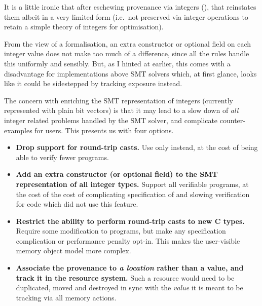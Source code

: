 It is a little ironic that after eschewing provenance via integers (),
that  reinstates them albeit in a very limited form (i.e.\ not preserved
via integer operations to retain a simple theory of integers for optimisation).

From the view of a formalisation, an extra constructor or optional field on
each integer value does not make too much of a difference, since all the rules
handle this uniformly and sensibly. But, as I hinted at earlier, this comes
with a disadvantage for implementations above SMT solvers which, at first
glance, looks like it could be sidestepped by tracking exposure instead.

The concern with enriching the SMT representation of integers (currently
represented with plain bit vectors) is that it may lead to a slow down of
\emph{all} integer related problems handled by the SMT solver, and complicate
counter-examples for users. This presents us with four options.
\begin{itemize}
    \item \textbf{Drop support for round-trip casts.} Use only
         instead, at the cost of being able
        to verify fewer programs.
    \item \textbf{Add an extra constructor (or optional field) to the SMT
        representation of all integer types.} Support all  verifiable
        programs, at the cost of the cost of complicating specification of
        and slowing verification for code which did not use this feature.
    \item \textbf{Restrict the ability to perform round-trip casts to new C
        types.} Require some modification to  programs, but
        make any specification complication or performance penalty opt-in. This
        makes the user-visible memory object model more complex.\label{sn:optin-typedef}
    \item \textbf{Associate the provenance to \emph{a location} rather than a
        value, and track it in the resource system.} Such a resource would need
        to be duplicated, moved and destroyed in sync with the \emph{value} it
        is meant to be tracking via all memory actions.
\end{itemize}

